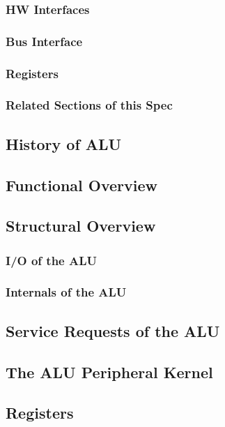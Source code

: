 \subsubsection{HW Interfaces}


\subsubsection{Bus Interface}

\subsubsection{Registers}

\subsubsection{Related Sections of this Spec}

\subsection{History of ALU}

\subsection{Functional Overview}
\label{subsec:alufunc01}

\subsection{Structural Overview}
\subsubsection{I/O of the ALU}

\subsubsection{Internals of the ALU}
%

\subsection{Service Requests of the ALU}

\subsection{The ALU Peripheral Kernel}



\subsection{Registers}



